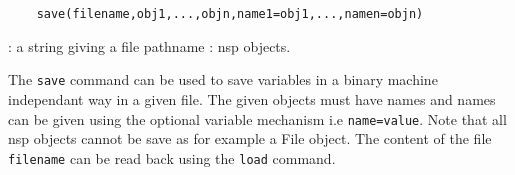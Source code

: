 \begin{mandesc}
\end{mandesc}

\begin{calling_sequence}
  \begin{verbatim}
    save(filename,obj1,...,objn,name1=obj1,...,namen=objn)  
  \end{verbatim}
\end{calling_sequence}
\begin{parameters}
  \begin{varlist}
    : a string giving a file pathname 
    : nsp objects. 
  \end{varlist}
\end{parameters}
\begin{mandescription}
  The \verb!save! command can be used to save variables in a binary machine independant way 
  in a given file. The given objects must have names and names can be given using the optional 
  variable mechanism i.e \verb+name=value+. Note that all nsp objects cannot be save as for example 
  a File object. The content of the file \verb+filename+ can be read back using the \verb+load+ command.
\end{mandescription}
\begin{examples}
  \begin{program}
  \end{program}
\end{examples}
\begin{manseealso}
\end{manseealso}

